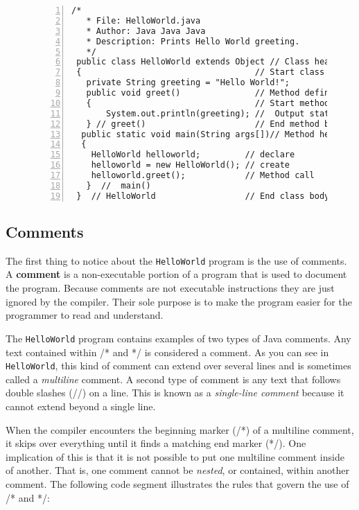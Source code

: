 \begin{figure}[hb]
\jjjprogstart
\begin{jjjlisting}
\begin{lstlisting}[numberstyle=\small,numbers=left]
  /*
   * File: HelloWorld.java
   * Author: Java Java Java
   * Description: Prints Hello World greeting.
   */
 public class HelloWorld extends Object // Class header
 {                                   // Start class body
   private String greeting = "Hello World!";  
   public void greet()               // Method definition
   {                                 // Start method body
       System.out.println(greeting); //  Output statement
   } // greet()                      // End method body
  public static void main(String args[])// Method header
  {                   
    HelloWorld helloworld;         // declare
    helloworld = new HelloWorld(); // create
    helloworld.greet();            // Method call
   }  //  main()
 }  // HelloWorld                  // End class body
\end{lstlisting}
\end{jjjlisting}
\end{figure}


\subsection{Comments}

\noindent The first thing to notice about the {\tt HelloWorld} program 
is the use of comments. A {\bf comment} is a non-executable portion of
a program that is used to document the program. Because comments are
not executable instructions they are just ignored by the compiler.
Their sole purpose is to make the program easier for the programmer to
read and understand.

The {\tt HelloWorld} program contains examples of two types of Java
comments.  Any text contained within /* and */ is considered a
comment.  As you can see in {\tt HelloWorld}, this kind of comment can
extend over several lines and is sometimes called a {\em multiline}
comment.  A second type of comment is any text that follows double
slashes (//) on a line.  This is known as a {\it single-line comment}
because it cannot extend beyond a single line.

When the compiler encounters the beginning marker (/*) of a multiline
comment, it skips over everything until it finds a matching end marker
(*/).  One implication of this is that it is not possible to put one
multiline comment inside of another. That is, one comment cannot be
{\it nested}, or contained, within another comment. The following code
segment illustrates the rules that govern the use of /* and */:


